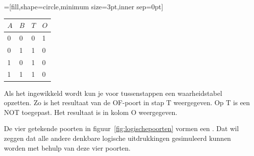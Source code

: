 \documentclass[../../main.tex]{subfiles}
\begin{document}
\begin{flushleft}
\begin{minipage}{.3\textwidth}
\begin{flushleft}
=[fill,shape=circle,minimum size=3pt,inner sep=0pt]
\end{flushleft}
\end{minipage}%
\hfill
\begin{minipage}{.25\textwidth}
\scriptsize{%
\begin{tabular}{|l|l|l|l|}
\hline
$A$ & $B$ & $T$ & $O$ \\ \hline
0     & 0     & 0 & 1 \\ \hline
0     & 1     & 1 & 0 \\ \hline
1     & 0     & 1 & 0 \\ \hline
1     & 1     & 1 & 0 \\ \hline
\end{tabular}
}
\end{minipage}
\hfill
\begin{minipage}{.35\textwidth}
\end{minipage}
\end{flushleft}

Als het ingewikkeld wordt kun je voor tussenstappen een waarheidstabel opzetten. Zo is het resultaat van de OF-poort in stap $\mathrm{T}$ weergegeven. Op $\mathrm{T}$ is een NOT toegepast. Het resultaat is in kolom $\mathrm{O}$ weergegeven.

De vier getekende poorten in figuur~\ref{fig:logischepoorten} vormen een . Dat wil zeggen dat alle andere denkbare logische uitdrukkingen gesimuleerd kunnen worden met behulp van deze vier poorten. 
\end{document}
